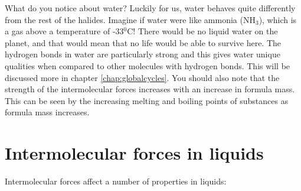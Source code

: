What do you notice about water? Luckily for us, water behaves quite differently from the rest of the halides. Imagine if water were like ammonia (NH$_{3}$), which is a gas above a temperature of -33$^{0}$C! There would be no liquid water on the planet, and that would mean that no life would be able to survive here. The hydrogen bonds in water are particularly strong and this gives water unique qualities when compared to other molecules with hydrogen bonds. This will be discussed more in chapter \ref{chap:globalcycles}. You should also note that the strength of the intermolecular forces increases with an increase in formula mass. This can be seen by the increasing melting and boiling points of substances as formula mass increases.


\section{Intermolecular forces in liquids}
\label{sec:intermolecular:liquids}

Intermolecular forces affect a number of properties in liquids:

